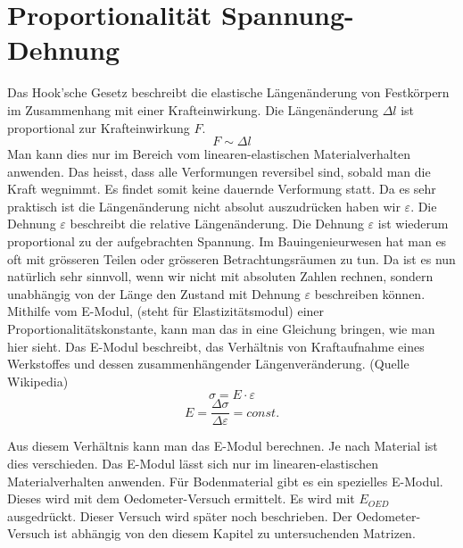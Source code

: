 \section{Proportionalität Spannung-Dehnung\label{spannung:section:Proportionalität Spannung-Dehnung}}
Das Hook'sche Gesetz beschreibt die elastische Längenänderung von Festkörpern im Zusammenhang mit einer Krafteinwirkung.
Die Längenänderung $\Delta l$ ist proportional zur Krafteinwirkung $F$.
\[
F
\sim
\Delta l
\]
Man kann dies nur im Bereich vom linearen-elastischen Materialverhalten anwenden.
Das heisst, dass alle Verformungen reversibel sind, sobald man die Kraft wegnimmt.
Es findet somit keine dauernde Verformung statt.
Da es sehr praktisch ist die Längenänderung nicht absolut auszudrücken haben wir $\varepsilon$.
Die Dehnung $\varepsilon$ beschreibt die relative Längenänderung.
Die Dehnung $\varepsilon$ ist wiederum proportional zu der aufgebrachten Spannung.
Im Bauingenieurwesen hat man es oft mit grösseren Teilen oder grösseren Betrachtungsräumen zu tun.
Da ist es nun natürlich sehr sinnvoll, wenn wir nicht mit absoluten Zahlen rechnen,
sondern unabhängig von der Länge den Zustand mit Dehnung $\varepsilon$ beschreiben können.
Mithilfe vom E-Modul, (steht für Elastizitätsmodul) einer Proportionalitätskonstante,
kann man das in eine Gleichung bringen, wie man hier sieht. Das E-Modul beschreibt,
das Verhältnis von Kraftaufnahme eines Werkstoffes und dessen zusammenhängender Längenveränderung.
(Quelle Wikipedia)
\[
\sigma
=
E\cdot\varepsilon
\]
\[
E
=
\frac{\Delta\sigma}{\Delta\varepsilon}
=
const.
\]

Aus diesem Verhältnis kann man das E-Modul berechnen.
Je nach Material ist dies verschieden.
Das E-Modul lässt sich nur im linearen-elastischen Materialverhalten anwenden.
Für Bodenmaterial gibt es ein spezielles E-Modul. Dieses wird mit dem Oedometer-Versuch ermittelt.
Es wird mit $E_{OED}$ ausgedrückt. Dieser Versuch wird später noch beschrieben.
Der Oedometer-Versuch ist abhängig von den diesem Kapitel zu untersuchenden Matrizen.